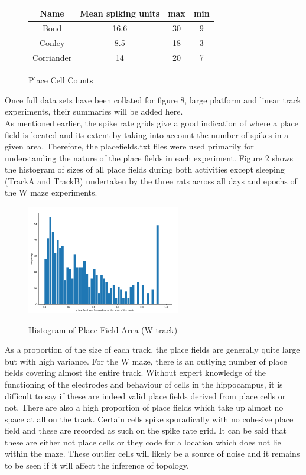 \documentclass[11pt]{report}
\begin{document}
\begin{figure}[h!]
\caption{Place Cell Counts}
\centering
\begin{tabular}{|c|c|c|c|}
\hline
Name & Mean spiking units & max & min \\
\hline
Bond & 16.6 & 30 & 9 \\
\hline
Conley & 8.5 & 18 & 3 \\
\hline
Corriander & 14 & 20 & 7 \\
\hline
\end{tabular}
\label{fig:d}
\end{figure}
 
Once full data sets have been collated for figure 8, large platform and linear track experiments, their summaries will be added here.\\
 
As mentioned earlier, the spike rate grids give a good indication of where a place field is located and its extent by taking into account the number of spikes in a given area. Therefore, the placefields.txt files were used primarily for understanding the nature of the place fields in each experiment. Figure \ref{fig:e} shows the histogram of sizes of all place fields during both activities except sleeping (TrackA and TrackB) undertaken by the three rats across all days and epochs of the W maze experiments.
 
\begin{figure}[h!]
\caption{Histogram of Place Field Area (W track)}
\centering
  \includegraphics[width=0.6\textwidth]{wmaze_pf_size_histogram}
\label{fig:e}
\end{figure}
 
As a proportion of the size of each track, the place fields are generally quite large but with high variance. For the W maze, there is an outlying number of place fields covering almost the entire track. Without expert knowledge of the functioning of the electrodes and behaviour of cells in the hippocampus, it is difficult to say if these are indeed valid place fields derived from place cells or not. There are also a high proportion of place fields which take up almost no space at all on the track. Certain cells spike sporadically with no cohesive place field and these are recorded as such on the spike rate grid. It can be said that these are either not place cells or they code for a location which does not lie within the maze. These outlier cells will likely be a source of noise and it remains to be seen if it will affect the inference of topology.\\
 
\end{document}
